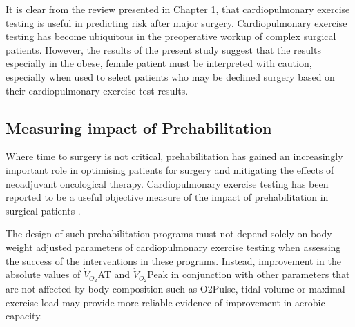 It is clear from the review presented in Chapter 1, that cardiopulmonary exercise testing is useful in predicting risk after major surgery. Cardiopulmonary exercise testing has become ubiquitous in the preoperative workup of complex surgical patients. However, the results of the present study suggest that the results especially in the obese, female patient must be interpreted with caution, especially when used to select patients who may be declined surgery based on their cardiopulmonary exercise test results.

\subsection{Measuring impact of Prehabilitation}

Where time to surgery is not critical, prehabilitation has gained an increasingly important role in optimising patients for surgery and mitigating the effects of neoadjuvant oncological therapy. Cardiopulmonary exercise testing has been reported to be a useful objective measure of the impact of prehabilitation in surgical patients \parencite{west_effect_2015}.

The design of such prehabilitation programs must not depend solely on body weight adjusted parameters of cardiopulmonary exercise testing when assessing the success of the interventions in these programs. Instead, improvement in the absolute values of $\dot{V}_{O_2}$AT and $\dot{V}_{O_2}$Peak in conjunction with other parameters that are not affected by body composition such as O2Pulse, tidal volume\parencite{jones_effects_2007} or maximal exercise load may provide more reliable evidence of improvement in aerobic capacity.















